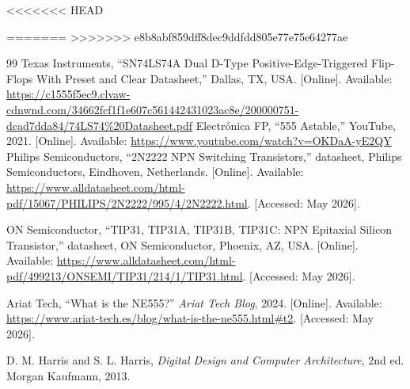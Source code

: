 \documentclass[12pt,onecolumn]{IEEEtran}
\begin{document}
<<<<<<< HEAD


=======
>>>>>>> e8b8abf859dff8dec9ddfdd805e77e75e64277ae
\begin{thebibliography}{99}
Texas Instruments, ``SN74LS74A Dual D-Type Positive-Edge-Triggered Flip-Flops With Preset and Clear Datasheet,'' Dallas, TX, USA. [Online]. Available: \url{https://c1555f5ec9.clvaw-cdnwnd.com/34662fcf1f1e607c561442431023ac8e/200000751-dcad7dda84/74LS74%20Datasheet.pdf}
Electrónica FP, ``555 Astable,'' YouTube, 2021. [Online]. Available: \url{https://www.youtube.com/watch?v=OKDaA-yE2QY}
Philips Semiconductors, ``2N2222 NPN Switching Transistors,'' datasheet, Philips Semiconductors, Eindhoven, Netherlands. [Online]. Available: \url{https://www.alldatasheet.com/html-pdf/15067/PHILIPS/2N2222/995/4/2N2222.html}. [Accessed: May 2026].

ON Semiconductor, ``TIP31, TIP31A, TIP31B, TIP31C: NPN Epitaxial Silicon Transistor,'' datasheet, ON Semiconductor, Phoenix, AZ, USA. [Online]. Available: \url{https://www.alldatasheet.com/html-pdf/499213/ONSEMI/TIP31/214/1/TIP31.html}. [Accessed: May 2026].

Ariat Tech, ``What is the NE555?'' \textit{Ariat Tech Blog}, 2024. [Online]. Available: \url{https://www.ariat-tech.es/blog/what-is-the-ne555.html#t2}. [Accessed: May 2026].


D. M. Harris and S. L. Harris, \textit{Digital Design and Computer
Architecture}, 2nd ed. Morgan Kaufmann, 2013.


\end{thebibliography}
\end{document}
